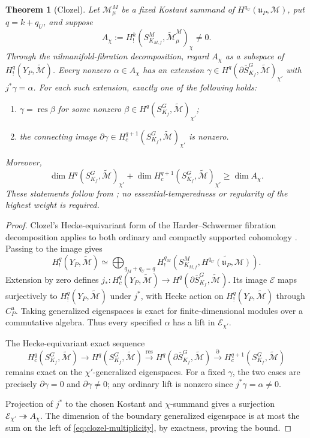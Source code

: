 \documentclass[12pt]{amsart}
\numberwithin{equation}{section}
\theoremstyle{plain}
\newtheorem{theorem}{Theorem}[section]
\theoremstyle{definition}
\theoremstyle{remark}
\newcommand{\cM}{\mathcal M}
\newcommand{\tcM}{\widetilde{\mathcal M}}
\begin{document}
\begin{theorem}[Clozel] \label{thm:clozel-boundary}
Let $\cM_\mu^M$ be a fixed Kostant summand of $H^{q_U}(\mathfrak u_P,\cM)$, put $q=k+q_U$, and suppose
\[
 A_\chi:=H_!^k(S^M_{K_{M,f}},\tcM_\mu^M)_\chi\ne0.
\]
Through the nilmanifold-fibration decomposition, regard $A_\chi$ as a subspace of $H_!^q(Y_P,\tcM)$. Every nonzero $\alpha\in A_\chi$ has an extension $\gamma\in H^q(\partial\overline S^G_{K_f},\tcM)_{\chi'}$ with $j^*\gamma=\alpha$. For each such extension, exactly one of the following holds:
\begin{enumerate}
\item $\gamma=\operatorname{res}\beta$ for some nonzero $\beta\in H^q(S^G_{K_f},\tcM)_{\chi'}$;
\item the connecting image $\partial\gamma\in H_c^{q+1}(S^G_{K_f},\tcM)_{\chi'}$ is nonzero.
\end{enumerate}
Moreover,
\begin{equation}\label{eq:clozel-multiplicity}
 \dim H^q(S^G_{K_f},\tcM)_{\chi'}+
 \dim H_c^{q+1}(S^G_{K_f},\tcM)_{\chi'}
 \geq\dim A_\chi.
\end{equation}
These statements follow from \cite[Thms.~3.4, 3.7 and Prop.~3.5]{Clozel2022}; no essential-temperedness or regularity of the highest weight is required. 
\end{theorem}

\begin{proof}
Clozel's Hecke-equivariant form of the Harder--Schwermer fibration decomposition applies to both ordinary and compactly supported cohomology \cite[Lemmas~3.1--3.3, \S3.4]{Clozel2022}. Passing to the image gives 
\[
 H_!^q(Y_P,\tcM)
 \simeq\bigoplus_{q_M+q_U=q}
 H_!^{q_M}(S^M_{K_{M,f}},\widetilde{H^{q_U}(\mathfrak u_P,\cM)}).
\]
Extension by zero defines $j_*:H_c^q(Y_P,\tcM)\to H^q(\partial\overline S^G_{K_f},\tcM)$. Its image $\mathcal E$ maps surjectively to $H_!^q(Y_P,\tcM)$ under $j^*$, with Hecke action on $H_!^q(Y_P,\tcM)$ through $C_P^{\mathrm a}$. Taking generalized eigenspaces is exact for finite-dimensional modules over a commutative algebra. Thus every specified $\alpha$ has a lift in $\mathcal E_{\chi'}$.

The Hecke-equivariant exact sequence
\begin{equation}\label{eq:clozel-exact-sequence}
 H_c^q(S^G_{K_f},\tcM)\longrightarrow H^q(S^G_{K_f},\tcM)
 \xrightarrow{\operatorname{res}}
 H^q(\partial\overline S^G_{K_f},\tcM)
 \xrightarrow{\partial}H_c^{q+1}(S^G_{K_f},\tcM)
\end{equation}
remains exact on the $\chi'$-generalized eigenspaces. For a fixed $\gamma$, the two cases are precisely $\partial\gamma=0$ and $\partial\gamma\ne0$; any ordinary lift is nonzero since $j^*\gamma=\alpha\ne0$.

Projection of $j^*$ to the chosen Kostant and $\chi$-summand gives a surjection $\mathcal E_{\chi'}\twoheadrightarrow A_\chi$. The dimension of the boundary generalized eigenspace is at most the sum on the left of \eqref{eq:clozel-multiplicity}, by exactness, proving the bound.
\end{proof}
\end{document}
